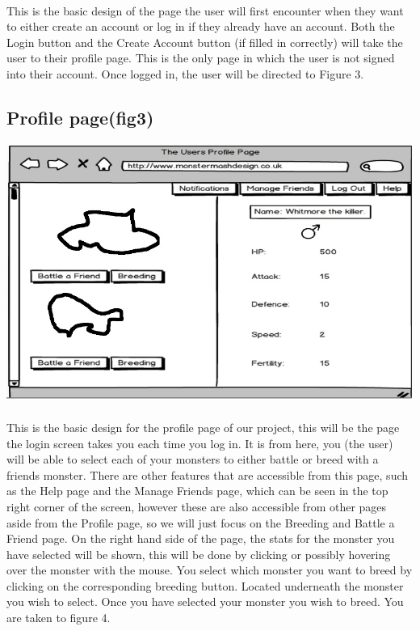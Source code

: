 \documentclass{project}
\begin{document}
\\

This is the basic design of the page the user will first encounter when they want to
either create an account or log in if they already have an account. Both the Login
button and the Create Account button (if filled in correctly) will take the user to
their profile page. This is the only page in which the user is not signed into their
account.
Once logged in, the user will be directed to Figure 3.
\newpage


\subsection{Profile page(fig3)}
\includegraphics[scale=0.5]{userProfile.jpg}
\\
\\
This is the basic design for the profile page of our project, this will be the page
the login screen takes you each time you log in. It is from here, you (the user)
will be able to select each of your monsters to either battle or breed with a friends
monster. There are other features that are accessible from this page, such as the
Help page and the Manage Friends page, which can be seen in the top right corner of
the screen, however these are also accessible from other pages aside from the Profile
page, so we will just focus on the Breeding and Battle a Friend page.
On the right hand side of the page, the stats for the monster you have selected
will be shown, this will be done by clicking or possibly hovering over the monster
with the mouse.
You select which monster you want to breed by clicking on the corresponding
breeding button. Located underneath the monster you wish to select. Once you
have selected your monster you wish to breed. You are taken to figure 4.
\newpage
\end{document}
